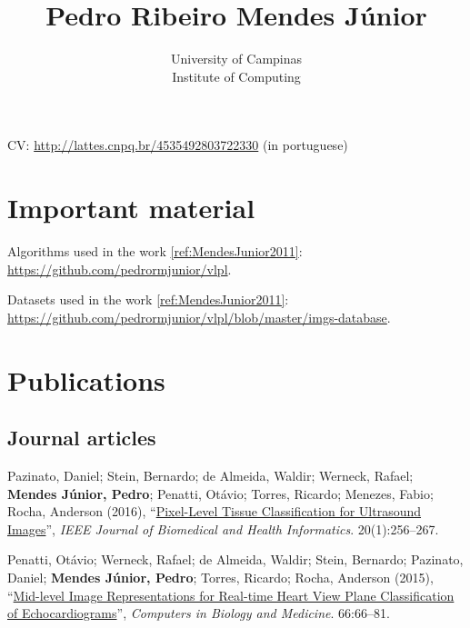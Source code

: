 \documentclass{article}
\title{Pedro Ribeiro Mendes J{\'u}nior}
\author{University of Campinas\\Institute of Computing}
\newcommand{\myurl}[1]{\href{#1}{#1}}
\begin{document}
\nocite{Penatti2015}
\nocite{Pazinato2015}
\nocite{MendesJunior2011}

\maketitle

CV: \myurl{http://lattes.cnpq.br/4535492803722330} (in portuguese)


\section*{Important material}
\label{sec:important-material}

Algorithms used in the work \ref{ref:MendesJunior2011}: \myurl{https://github.com/pedrormjunior/vlpl}.

Datasets used in the work \ref{ref:MendesJunior2011}: \myurl{https://github.com/pedrormjunior/vlpl/blob/master/imgs-database}.

\section*{Publications}

\subsection*{Journal articles}

\begin{enumerate}[label={[\arabic*]}]
\item\label{ref:Pazinato2016} Pazinato, Daniel; Stein, Bernardo; de Almeida, Waldir; Werneck, Rafael; \textbf{Mendes Júnior, Pedro}; Penatti, Otávio; Torres, Ricardo; Menezes, Fabio; Rocha, Anderson (2016), ``\href{http://dx.doi.org/10.1109/JBHI.2014.2386796}{Pixel-Level Tissue Classification for Ultrasound Images}'', \emph{IEEE Journal of Biomedical and Health Informatics}. 20(1):256--267.
\item\label{ref:Penatti2015} Penatti, Otávio; Werneck, Rafael; de Almeida, Waldir; Stein, Bernardo; Pazinato, Daniel; \textbf{Mendes Júnior, Pedro}; Torres, Ricardo; Rocha, Anderson (2015), ``\href{http://dx.doi.org/10.1016/j.compbiomed.2015.08.004}{Mid-level Image Representations for Real-time Heart View Plane Classification of Echocardiograms}'', \emph{Computers in Biology and Medicine}. 66:66--81.
\end{enumerate}
\end{document}
